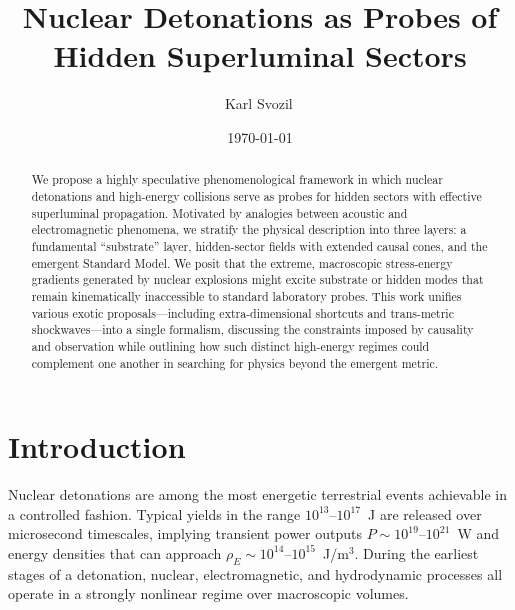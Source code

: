 \documentclass[aps,prd,twocolumn,nofootinbib,superscriptaddress]{revtex4-2}
\begin{document}
\title{Nuclear Detonations as Probes of Hidden Superluminal Sectors}

\author{Karl Svozil\,}


\date{\today}

\begin{abstract}
We propose a highly speculative phenomenological framework in which nuclear detonations and high-energy collisions serve as probes for hidden sectors with effective superluminal propagation. Motivated by analogies between acoustic and electromagnetic phenomena, we stratify the physical description into three layers: a fundamental ``substrate'' layer, hidden-sector fields with extended causal cones, and the emergent Standard Model. We posit that the extreme, macroscopic stress-energy gradients generated by nuclear explosions might excite substrate or hidden modes that remain kinematically inaccessible to standard laboratory probes. This work unifies various exotic proposals---including extra-dimensional shortcuts and trans-metric shockwaves---into a single formalism, discussing the constraints imposed by causality and observation while outlining how such distinct high-energy regimes could complement one another in searching for physics beyond the emergent metric.
\end{abstract}

\maketitle

\section{Introduction}
\label{sec:intro}

Nuclear detonations are among the most energetic terrestrial events achievable in a controlled fashion. Typical yields in the range $10^{13}$--$10^{17}$~J are released over microsecond timescales, implying transient power outputs $P \sim 10^{19}$--$10^{21}$~W and energy densities that can approach $\rho_E \sim 10^{14}$--$10^{15}$~J/m$^3$. During the earliest stages of a detonation, nuclear, electromagnetic, and hydrodynamic processes all operate in a strongly nonlinear regime over macroscopic volumes.
\end{document}
